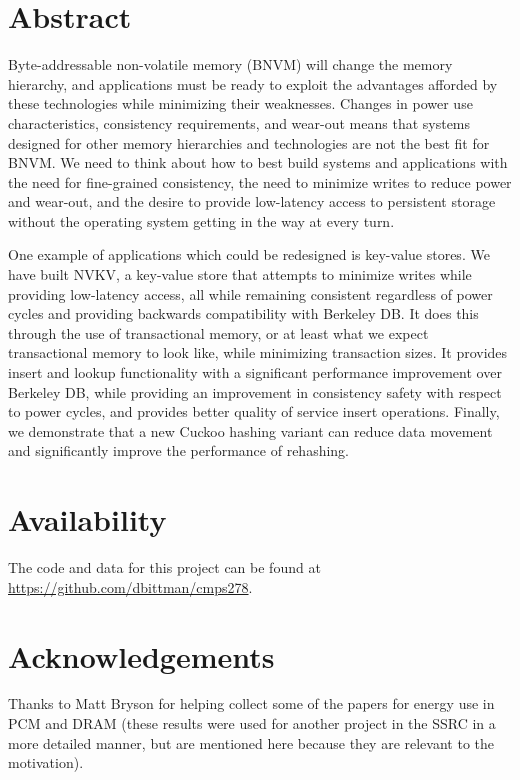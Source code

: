 \documentclass[twocolumn,11pt]{article}
\newcommand{\bdb}{Berkeley DB\xspace}
\begin{document}
\section*{Abstract}


Byte-addressable non-volatile memory (BNVM) will change the memory hierarchy, and
applications must be ready to exploit the advantages afforded by these
technologies while minimizing their weaknesses. Changes in power use
characteristics, consistency requirements, and wear-out means that systems
designed for other memory hierarchies and technologies are not the best fit for
BNVM. We need to think about how to best build systems and applications with the
need for fine-grained consistency, the need to minimize writes to reduce power
and wear-out, and the desire to provide low-latency access to persistent storage
without the operating system getting in the way at every turn.


One example of applications which could be redesigned is key-value stores. We
have built NVKV, a key-value store that attempts to minimize writes while
providing low-latency access, all while remaining consistent regardless of power
cycles and providing backwards compatibility with \bdb. It does this through the
use of transactional memory, or at least what we expect transactional memory to
look like, while minimizing transaction sizes. It provides insert and lookup
functionality with a significant performance improvement over \bdb, while
providing an improvement in consistency safety with respect to power cycles, and
provides better quality of service insert operations. Finally, we demonstrate
that a new Cuckoo hashing variant can reduce data movement and significantly improve the
performance of rehashing.
















\section*{Availability}
The code and data for this project can be found
at \url{https://github.com/dbittman/cmps278}.

\section*{Acknowledgements}

Thanks to Matt Bryson for helping collect some of the papers for energy use
in PCM and DRAM (these results were used for another project in the SSRC in a
more detailed manner, but are mentioned here because they are relevant to
the motivation).



\end{document}
